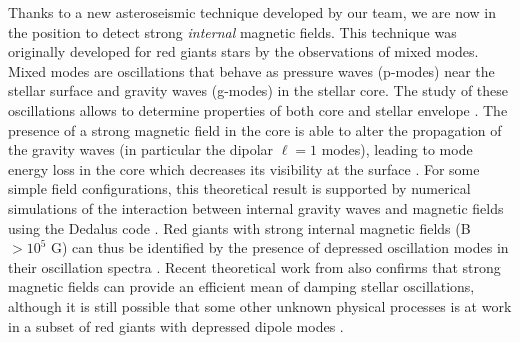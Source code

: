 Thanks to a new asteroseismic technique developed by our team, we are now in the position to detect strong {\it internal} magnetic fields. This technique was originally developed for red giants stars by  the observations of mixed modes. Mixed modes are oscillations that behave as pressure waves (p-modes) near the stellar surface and gravity waves (g-modes) in the stellar core. The study of these oscillations allows to determine properties of both core and stellar envelope \citep[e.g][]{Beck_2011}. The presence of a strong magnetic field in the core is able to alter the propagation of the gravity waves (in particular the dipolar $\ell =1$ modes),
leading to mode energy loss in the core which decreases its visibility at the surface \citep{Fuller_2015}. For some simple field configurations, this theoretical result is supported  by numerical simulations of the interaction between internal gravity waves and magnetic fields using the Dedalus code \citep{Lecoanet_2016}. Red giants with strong internal magnetic fields (B $> 10^5$ G) can thus be identified by the presence of depressed oscillation modes in their oscillation spectra \citep{Fuller_2015,Stello_2016}. Recent theoretical work from \citet{2017MNRAS.467.3212L} also confirms that  strong magnetic fields can provide an efficient mean of damping stellar oscillations, although it is still possible that some other unknown physical processes is at work in a subset of red giants with depressed dipole modes \citet{Mosser_2017}.

